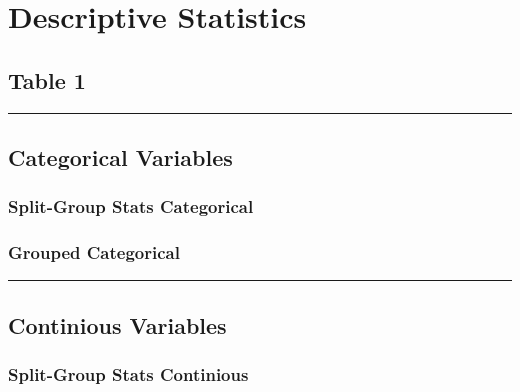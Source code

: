 \documentclass[]{article}
\begin{document}
\pagebreak

\hypertarget{descriptive-statistics}{%
\section{Descriptive Statistics}\label{descriptive-statistics}}

\hypertarget{table-1}{%
\subsection{Table 1}\label{table-1}}

\begin{center}\rule{0.5\linewidth}{\linethickness}\end{center}

\hypertarget{categorical-variables}{%
\subsection{Categorical Variables}\label{categorical-variables}}

\hypertarget{split-group-stats-categorical}{%
\subsubsection{Split-Group Stats
Categorical}\label{split-group-stats-categorical}}

\hypertarget{grouped-categorical}{%
\subsubsection{Grouped Categorical}\label{grouped-categorical}}

\pagebreak

\begin{center}\rule{0.5\linewidth}{\linethickness}\end{center}

\hypertarget{continious-variables}{%
\subsection{Continious Variables}\label{continious-variables}}

\hypertarget{split-group-stats-continious}{%
\subsubsection{Split-Group Stats
Continious}\label{split-group-stats-continious}}
\end{document}
